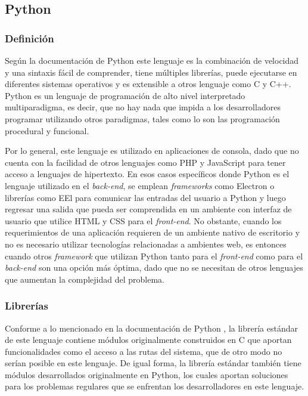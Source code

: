 \subsection{Python}
\subsubsection{Definición}
Según la documentación de Python \parencite{Pythondoc} este lenguaje es la combinación de velocidad y una sintaxis fácil de comprender, tiene múltiples librerías, puede ejecutarse en diferentes sistemas operativos y es extensible a otros lenguaje como C y C++. Python \parencite{Python3} es un lenguaje de programación de alto nivel interpretado multiparadigma, es decir, que no hay nada que impida a los desarrolladores programar utilizando otros paradigmas, tales como lo son las programación procedural y funcional.

Por lo general, este lenguaje es utilizado en aplicaciones de consola, dado que no cuenta con la facilidad de otros lenguajes como PHP y JavaScript para tener acceso a lenguajes de hipertexto. En esos casos específicos donde Python es el lenguaje utilizado en el \textit{back-end}, se emplean \textit{frameworks} como Electron o librerías como EEl para comunicar las entradas del usuario a Python y luego regresar una salida que pueda ser comprendida en un ambiente con interfaz de usuario que utilice HTML y CSS para el \textit{front-end}. No obstante, cuando los requerimientos de una aplicación requieren de un ambiente nativo de escritorio y no es necesario utilizar tecnologías relacionadas a ambientes web, es entonces cuando otros \textit{framework} que utilizan Python tanto para el \textit{front-end} como para el \textit{back-end} son una opción más óptima, dado que no se necesitan de otros lenguajes que aumentan la complejidad del problema. 

\subsubsection{Librerías}
Conforme a lo mencionado en la documentación de Python \parencite{Pythondoc}, la librería estándar de este lenguaje contiene módulos originalmente construidos en C que aportan funcionalidades como el acceso a las rutas del sistema, que de otro modo no serían posible en este lenguaje. De igual forma, la librería estándar también tiene módulos desarrollados originalmente en Python, los cuales aportan soluciones para los problemas regulares que se enfrentan los desarrolladores en este lenguaje.

